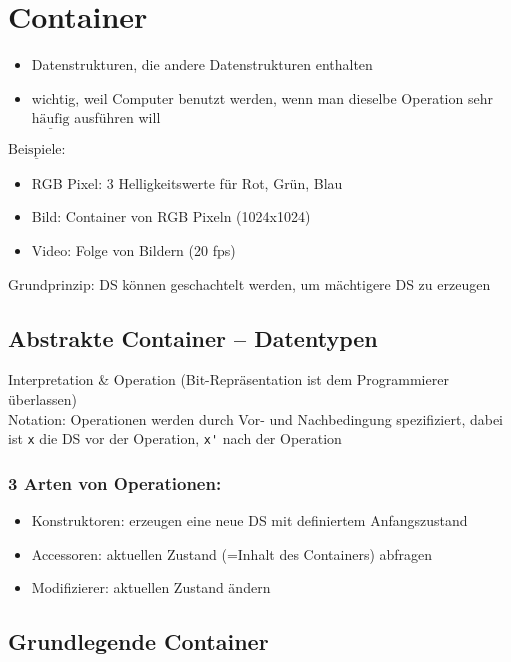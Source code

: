 \chapter{Container}
\begin{itemize}[label={-}]
    \item Datenstrukturen, die andere Datenstrukturen enthalten
    \item wichtig, weil Computer benutzt werden, wenn man dieselbe Operation sehr $\underline{\text{häufig}}$ ausführen will
\end{itemize}
$\underline{\text{Beispiele:}}$
\begin{itemize}[label={-}]
    \item RGB Pixel: 3 Helligkeitswerte für Rot, Grün, Blau
    \item Bild: Container von RGB Pixeln (1024x1024)
    \item Video: Folge von Bildern (20 fps)
\end{itemize}
Grundprinzip: DS können geschachtelt werden, um mächtigere DS zu erzeugen



\section{Abstrakte Container – Datentypen}

Interpretation \& Operation (Bit-Repräsentation ist dem Programmierer überlassen) \\

Notation: Operationen werden durch Vor- und Nachbedingung spezifiziert, dabei ist \verb|x| die DS vor der Operation, \verb|x'| nach der Operation \\

\subsection*{3 Arten von Operationen: }
\begin{itemize}[label={-}]
    \item Konstruktoren: erzeugen eine neue DS mit definiertem Anfangszustand
    \item Accessoren: aktuellen Zustand (=Inhalt des Containers) abfragen
    \item Modifizierer: aktuellen Zustand ändern
\end{itemize}


\section{Grundlegende Container}

